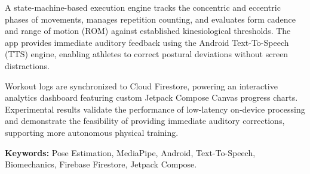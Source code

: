 A state-machine-based execution engine tracks the concentric and eccentric phases of movements, manages repetition counting, and evaluates form cadence and range of motion (ROM) against established kinesiological thresholds. The app provides immediate auditory feedback using the Android Text-To-Speech (TTS) engine, enabling athletes to correct postural deviations without screen distractions.

Workout logs are synchronized to Cloud Firestore, powering an interactive analytics dashboard featuring custom Jetpack Compose Canvas progress charts. Experimental results validate the performance of low-latency on-device processing and demonstrate the feasibility of providing immediate auditory corrections, supporting more autonomous physical training.

\vspace{1cm}
\noindent\textbf{Keywords:} Pose Estimation, MediaPipe, Android, Text-To-Speech, Biomechanics, Firebase Firestore, Jetpack Compose.